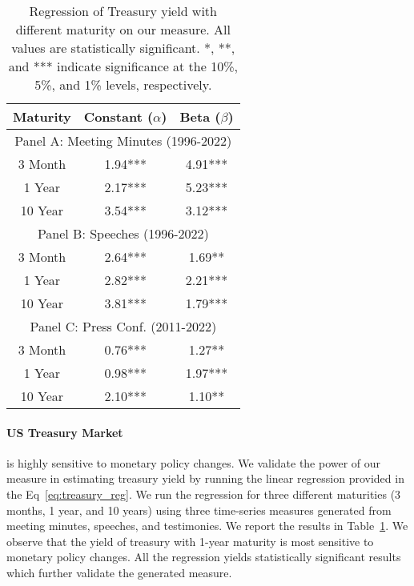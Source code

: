 \documentclass[11pt]{article}
\begin{document}
\begin{table}[ht]
\centering
\footnotesize
\begin{tabular}{ccc}
\hline
\textbf{Maturity} & \textbf{Constant ($\alpha$)} & \textbf{Beta ($\beta$)} \\
\hline
\multicolumn{3}{c}{Panel A: Meeting Minutes (1996-2022)}\\
\hline
3 Month & 1.94*** & 4.91*** \\
1 Year & 2.17*** & 5.23*** \\
10 Year & 3.54*** & 3.12*** \\
\hline
\multicolumn{3}{c}{Panel B: Speeches (1996-2022)}\\
\hline
3 Month & 2.64*** & 1.69** \\
1 Year & 2.82*** & 2.21*** \\
10 Year & 3.81*** & 1.79*** \\
\hline
\multicolumn{3}{c}{Panel C: Press Conf. (2011-2022)}\\
\hline
3 Month & 0.76*** & 1.27** \\
1 Year & 0.98*** & 1.97*** \\
10 Year & 2.10*** & 1.10** \\
\hline
\end{tabular}
\caption{Regression of Treasury yield with different maturity on our measure. All values are statistically significant.  *, **, and *** indicate significance at the 10\%, 5\%, and 1\% levels, respectively. }
\label{tb:treasury_reg}
\end{table}



\paragraph{US Treasury Market} is highly sensitive to monetary policy changes. We validate the power of our measure in estimating treasury yield by running the linear regression provided in the Eq~\ref{eq:treasury_reg}. We run the regression for three different maturities (3 months, 1 year, and 10 years) using three time-series measures generated from meeting minutes, speeches, and testimonies. We report the results in Table~\ref{tb:treasury_reg}. We observe that the yield of treasury with 1-year maturity is most sensitive to monetary policy changes. All the regression yields statistically significant results which further validate the generated measure. 
\end{document}
